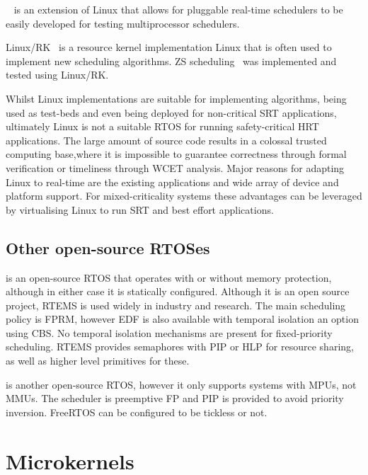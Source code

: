 \litmus~\citep{Calandrino_LBDA_07} is an extension of Linux that allows for pluggable real-time
schedulers to be easily developed for testing multiprocessor schedulers.

Linux/RK~\citep{Oikawa_Rajkumar_98} is a resource kernel implementation Linux that is often used to
implement new scheduling algorithms.  \gls{ZS} scheduling~\citep{deNiz_LR_09} was implemented and
tested using Linux/RK.

Whilst Linux implementations are suitable for implementing algorithms, being used as test-beds and
even being deployed for non-critical \gls{SRT} applications, ultimately Linux is not a suitable
\gls{RTOS} for running safety-critical \gls{HRT} applications. The large amount of source code
results in a colossal trusted computing base,where it is impossible to guarantee correctness through
formal verification or timeliness through {\gls{WCET}} analysis.  Major reasons for adapting Linux
to real-time are the existing applications and wide array of device and platform support. For
mixed-criticality systems these advantages can be leveraged by virtualising Linux to run \gls{SRT}
and best effort applications.

\subsection{Other open-source RTOSes}

\citet{RTEMS:URL} is an open-source \gls{RTOS} that operates with or without
memory protection, although in either case it is statically configured.  Although it is an open
source project, RTEMS is used widely in industry and research.  The main scheduling policy is
\gls{FPRM}, however \gls{EDF} is also available with temporal isolation an option using \gls{CBS}.
No temporal isolation mechanisms are present for fixed-priority scheduling.  RTEMS provides
semaphores with \gls{PIP} or \gls{HLP} for resource sharing, as well as
higher level primitives for these. 

\citet{FreeRTOS:URL} is another open-source \gls{RTOS}, however it only supports systems with \glspl{MPU}, not
\glspl{MMU}. The scheduler is preemptive \gls{FP} and \gls{PIP} is provided to avoid priority inversion.
FreeRTOS can be configured to be tickless or not.

\section{Microkernels}

